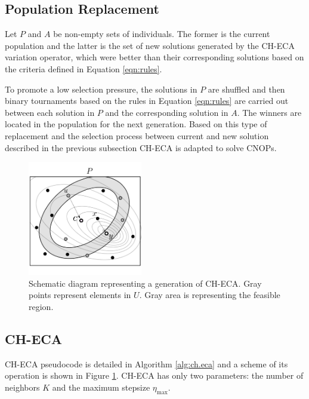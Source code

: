 \documentclass[conference]{IEEEtran}
\begin{document}
\subsection{Population Replacement} %

Let $P$ and $A$  be  non-empty sets of individuals. The former is the current 
population and the latter is the set of new solutions generated by the CH-ECA 
variation operator, which were better than their corresponding solutions based 
on the criteria defined in Equation \ref{eqn:rules}. 

To promote a low selection pressure, the solutions in $P$ are shuffled and then 
binary tournaments based on the rules in Equation \ref{eqn:rules} are carried out 
between each solution in $P$ and the corresponding solution in $A$. The winners 
are located in the population for the next generation. Based on this type of 
replacement and the selection process between current and new solution described 
in the previous subsection CH-ECA is adapted to solve CNOPs. 

\begin{figure}[!ht]
	\centering
	\includegraphics[width=5cm]{img/ecaG.pdf}
	\caption{Schematic diagram representing a generation of CH-ECA. Gray points %
	represent elements in $U$. Gray area is representing the feasible region.}
	\label{fig:ecag}       %
\end{figure}


\subsection{CH-ECA}

CH-ECA pseudocode is detailed in Algorithm \ref{alg:ch.eca} and a scheme of its 
operation is shown in Figure \ref{fig:ecag}. CH-ECA has only two parameters: the 
number of neighbors $K$ and  the maximum stepsize $\eta_{\max}$. 
\end{document}
